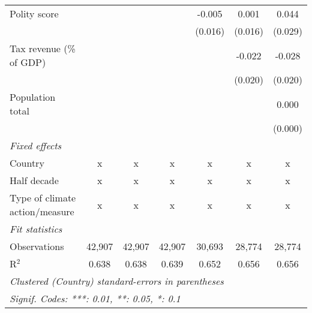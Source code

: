 \begin{tabular}{lcccccc}
   Polity score                                                     &         &                &                & -0.005         & 0.001          & 0.044\\   
                                                                    &         &                &                & (0.016)        & (0.016)        & (0.029)\\   
   Tax revenue (\% of GDP)                                          &         &                &                &                & -0.022         & -0.028\\   
                                                                    &         &                &                &                & (0.020)        & (0.020)\\   
   Population total                                                 &         &                &                &                &                & 0.000\\   
                                                                    &         &                &                &                &                & (0.000)\\   
   \emph{Fixed effects}\\
   Country                                                          & x       & x              & x              & x              & x              & x\\  
   Half decade                                                      & x       & x              & x              & x              & x              & x\\  
   Type of climate action/measure                                   & x       & x              & x              & x              & x              & x\\  
   \midrule \emph{Fit statistics}\\
   Observations                                                     & 42,907  & 42,907         & 42,907         & 30,693         & 28,774         & 28,774\\  
   R$^2$                                                            & 0.638   & 0.638          & 0.639          & 0.652          & 0.656          & 0.656\\  
   \midrule
   \multicolumn{7}{l}{\emph{Clustered (Country) standard-errors in parentheses}}\\
   \multicolumn{7}{l}{\emph{Signif. Codes: ***: 0.01, **: 0.05, *: 0.1}}\\
\end{tabular}
\par\endgroup



